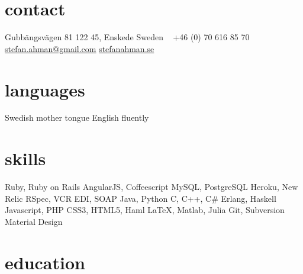\documentclass[]{friggeri-cv} %
\begin{document}


\begin{aside} %
\section{contact}
Gubbängsvägen 81
122 45, Enskede
Sweden
~
+46 (0) 70 616 85 70
~
\href{mailto:stefan.ahman@gmail.com}{stefan.ahman@gmail.com}
\href{http://www.stefanahman.se}{stefanahman.se}
\section{languages}
Swedish mother tongue
English fluently
\section{skills}
Ruby, Ruby on Rails
AngularJS, Coffeescript
MySQL, PostgreSQL
Heroku, New Relic
RSpec, VCR
EDI, SOAP
Java, Python
C, C++, C\#
Erlang, Haskell
Javascript, PHP
CSS3, HTML5, Haml
LaTeX, Matlab, Julia
Git, Subversion
Material Design
\end{aside}


\section{education}
\end{document}
